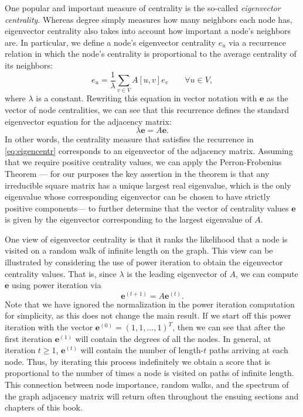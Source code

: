 \documentclass[10pt]{book}
\let\defaultmarginpar\marginpar
\renewcommand\marginpar[2][]{\defaultmarginpar{\itshape\color{gray}#2}}
\begin{document}
One popular and important measure of centrality is the so-called \emph{eigenvector centrality}\marginpar{eigenvector centrality}. Whereas degree simply measures how many neighbors each node has, eigenvector centrality also takes into account how important a node's neighbors are. In particular, we define a node's eigenvector centrality $e_u$ via a recurrence relation in which the node's centrality is proportional to the average centrality of its neighbors:
\begin{equation}
    e_u = \frac1\lambda \sum_{v \in V} A[u, v] e_v \qquad \forall u \in V,
    \label{eq:eigencentr}
\end{equation}
where $\lambda$ is a constant. Rewriting this equation in vector notation with $\mathbf e$ as the vector of node centralities, we can see that this recurrence defines the standard eigenvector equation for the adjacency matrix:
\begin{equation}
    \lambda \mathbf e = A \mathbf e.
\end{equation}
In other words, the centrality measure that satisfies the recurrence in \autoref{eq:eigencentr} corresponds to an eigenvector of the adjacency matrix. Assuming that we require positive centrality values, we can apply the Perron-Frobenius Theorem --- for our purposes the key assertion in the theorem is that any irreducible square matrix has a unique largest real eigenvalue, which is the only eigenvalue whose corresponding eigenvector can be chosen to have strictly positive components---  to further determine that the vector of centrality values $\mathbf e$ is given by the eigenvector corresponding to the largest eigenvalue of $A$.

One view of eigenvector centrality is that it ranks the likelihood that a node is visited on a random walk of infinite length on the graph. This view can be illustrated by considering the use of power iteration to obtain the eigenvector centrality values. That is, since $\lambda$ is the leading eigenvector of $A$, we can compute $\mathbf e$ using power iteration via
\begin{equation}
    \mathbf e^{(t+1)} = A \mathbf e^{(t)}.
\end{equation}
Note that we have ignored the normalization in the power iteration computation for simplicity, as this does not change the main result. If we start off this power iteration with the vector $\mathbf e^{(0)} = (1, 1, \ldots, 1)^T$, then we can see that after the first iteration $\mathbf e^{(1)}$ will contain the degrees of all the nodes. In general, at iteration $t \ge 1$, $\mathbf e^{(t)}$ will contain the number of length-$t$ paths arriving at each node. Thus, by iterating this process indefinitely we obtain a score that is proportional to the number of times a node is visited on paths of infinite length. This connection between node importance, random walks, and the spectrum of the graph adjacency matrix will return often throughout the ensuing sections and chapters of this book.
\smallskip
\end{document}
